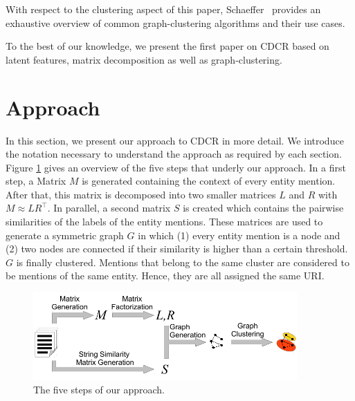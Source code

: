 With respect to the clustering aspect of this paper, Schaeffer~\cite{schaeffer2007graph} provides an exhaustive overview of common graph-clustering algorithms and their use cases.

To the best of our knowledge, we present the first paper on CDCR based on latent features, matrix decomposition as well as graph-clustering.


\section{Approach}
In this section, we present our approach to CDCR in more detail. 
We introduce the notation necessary to understand the approach as required by each section.
Figure \ref{fig:SystemOverview} gives an overview of the five steps that underly our approach.
In a first step, a Matrix $M$ is generated containing the context of every entity mention.
After that, this matrix is decomposed into two smaller matrices $L$ and $R$ with $M \approx LR^{\top}$.
In parallel, a second matrix $S$ is created which contains the pairwise similarities of the labels of the entity mentions.
These matrices are used to generate a symmetric graph $G$ in which (1) every entity mention is a node and (2) two nodes are connected if their similarity is higher than a certain threshold.
$G$ is finally clustered.
Mentions that belong to the same cluster are considered to be mentions of the same entity.
Hence, they are all assigned the same URI.

\begin{figure}
\centering
\includegraphics[width=0.9\textwidth]{chapter_three/unstructured_annotation/LD4IE_ISWC_CDCR/cdcr_SystemOverview.pdf}
\caption{The five steps of our approach.}
\label{fig:SystemOverview}
\end{figure}


